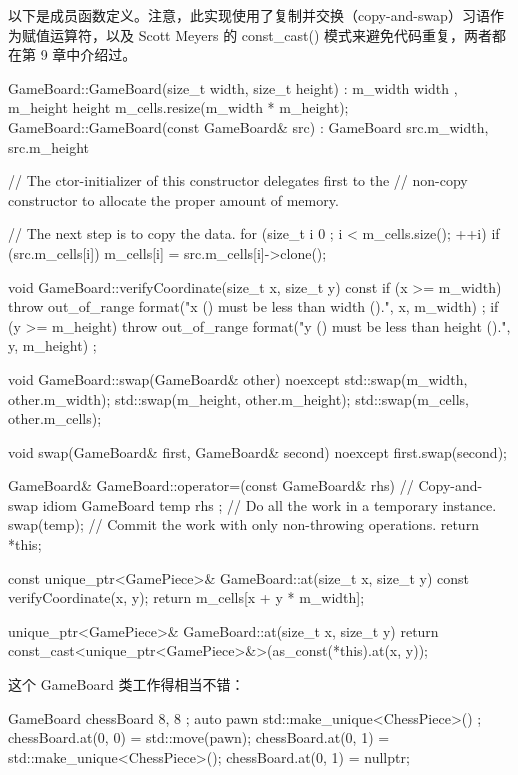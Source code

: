 以下是成员函数定义。注意，此实现使用了复制并交换（copy-and-swap）习语作为赋值运算符，以及 Scott Meyers 的 const\_cast() 模式来避免代码重复，两者都在第 9 章中介绍过。

\begin{cpp}
GameBoard::GameBoard(size_t width, size_t height)
    : m_width { width }, m_height { height }
{
    m_cells.resize(m_width * m_height);
}
GameBoard::GameBoard(const GameBoard& src)
    : GameBoard { src.m_width, src.m_height }
{
    // The ctor-initializer of this constructor delegates first to the
    // non-copy constructor to allocate the proper amount of memory.

    // The next step is to copy the data.
    for (size_t i { 0 }; i < m_cells.size(); ++i) {
        if (src.m_cells[i]) {
            m_cells[i] = src.m_cells[i]->clone();
        }
    }
}

void GameBoard::verifyCoordinate(size_t x, size_t y) const
{
    if (x >= m_width) {
        throw out_of_range {
            format("x ({}) must be less than width ({}).", x, m_width) };
    }
    if (y >= m_height) {
        throw out_of_range {
            format("y ({}) must be less than height ({}).", y, m_height) };
    }
}

void GameBoard::swap(GameBoard& other) noexcept
{
    std::swap(m_width, other.m_width);
    std::swap(m_height, other.m_height);
    std::swap(m_cells, other.m_cells);
}

void swap(GameBoard& first, GameBoard& second) noexcept
{
    first.swap(second);
}

GameBoard& GameBoard::operator=(const GameBoard& rhs)
{
    // Copy-and-swap idiom
    GameBoard temp { rhs }; // Do all the work in a temporary instance.
    swap(temp); // Commit the work with only non-throwing operations.
    return *this;
}

const unique_ptr<GamePiece>& GameBoard::at(size_t x, size_t y) const
{
    verifyCoordinate(x, y);
    return m_cells[x + y * m_width];
}

unique_ptr<GamePiece>& GameBoard::at(size_t x, size_t y)
{
    return const_cast<unique_ptr<GamePiece>&>(as_const(*this).at(x, y));
}
\end{cpp}

这个 GameBoard 类工作得相当不错：

\begin{cpp}
GameBoard chessBoard { 8, 8 };
auto pawn { std::make_unique<ChessPiece>() };
chessBoard.at(0, 0) = std::move(pawn);
chessBoard.at(0, 1) = std::make_unique<ChessPiece>();
chessBoard.at(0, 1) = nullptr;
\end{cpp}

